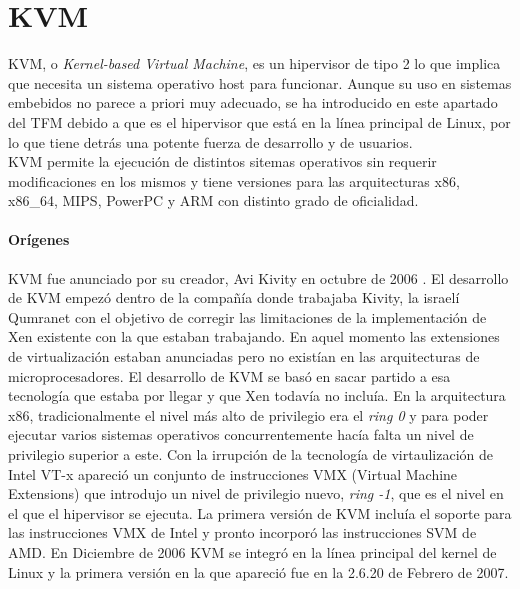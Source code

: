 \section{KVM}
KVM, o \textit{Kernel-based Virtual Machine}, es un hipervisor de tipo 2 lo que implica que necesita un sistema operativo host para funcionar. Aunque su uso en sistemas embebidos no parece a priori muy adecuado,
se ha introducido en este apartado del TFM debido a que es el hipervisor que está en la línea principal de Linux, por lo que tiene detrás una potente fuerza de desarrollo y de usuarios.\\
KVM permite la ejecución de distintos sitemas operativos \cite{kvm_list} sin requerir modificaciones en los mismos y tiene versiones para las arquitecturas x86, x86\_64, MIPS, PowerPC y ARM con distinto grado de oficialidad.


\paragraph{Orígenes}
KVM fue anunciado por su creador, Avi Kivity en octubre de 2006 \cite{kvm_2}. El desarrollo de KVM empezó dentro de la compañía donde trabajaba Kivity, la israelí Qumranet con el objetivo de corregir las limitaciones de la implementación de Xen existente con la que estaban trabajando. En aquel momento las extensiones de virtualización estaban anunciadas pero no existían en las arquitecturas de microprocesadores. El desarrollo de KVM se basó en sacar partido a esa tecnología que estaba por llegar y que Xen todavía no incluía. En la arquitectura x86, tradicionalmente el nivel más alto de privilegio era el \textit{ring 0} y para poder ejecutar varios sistemas operativos concurrentemente hacía falta un nivel de privilegio superior a este. Con la irrupción de la tecnología de virtaulización de Intel VT-x apareció un conjunto de instrucciones VMX (Virtual Machine Extensions) que introdujo un nivel de privilegio nuevo, \textit{ring -1}, que es el nivel en el que el hipervisor se ejecuta. La primera versión de KVM incluía el soporte para las instrucciones VMX de Intel y pronto incorporó las instrucciones SVM de AMD. En Diciembre de 2006 KVM se integró en la línea principal del kernel de Linux y la primera versión en la que apareció fue en la 2.6.20 de Febrero de 2007.

